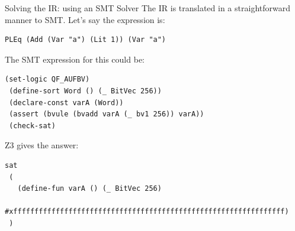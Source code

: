 \documentclass[aspectratio=169]{beamer}
\begin{document}





 \begin{frame}[fragile=singleslide]{Solving the IR: using an SMT Solver}
 The IR is translated in a straightforward manner to SMT. Let's say the expression is:

 \begin{Verbatim}[frame=single, framerule=0.2mm, framesep=2mm,fontsize=\footnotesize]
 PLEq (Add (Var "a") (Lit 1)) (Var "a")
 \end{Verbatim}

 The SMT expression for this could be:

 \begin{Verbatim}[frame=single, framerule=0.2mm, framesep=2mm,fontsize=\footnotesize]
 (set-logic QF_AUFBV)
 (define-sort Word () (_ BitVec 256))
 (declare-const varA (Word))
 (assert (bvule (bvadd varA (_ bv1 256)) varA))
 (check-sat)
 \end{Verbatim}

 Z3 gives the answer:

 \begin{Verbatim}[frame=single, framerule=0.2mm, framesep=2mm,fontsize=\footnotesize]
 sat
 (
   (define-fun varA () (_ BitVec 256)
     #xffffffffffffffffffffffffffffffffffffffffffffffffffffffffffffffff)
 )
 \end{Verbatim}
 \end{frame}
\end{document}
